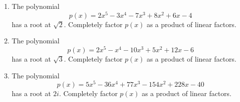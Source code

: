 \documentclass{article}
\begin{document}
\ActivityTitle[class={College Algebra}, number={5}, name={Polynomials 3}]

\begin{enumerate}
\item The polynomial \[ p(x) = 2x^5 - 3x^4 - 7x^3 + 8x^2 + 6x - 4 \] has a root at $\sqrt{2}$. Completely factor $p(x)$ as a product of linear factors. \vspace{7cm}

\newpage

\item The polynomial \[ p(x) = 2x^5 - x^4 - 10x^3 + 5x^2 + 12x - 6 \] has a root at $\sqrt{3}$. Completely factor $p(x)$ as a product of linear factors. \vspace{7cm}

\newpage

\item The polynomial \[ p(x) = 5x^5 - 36x^4 + 77x^3 - 154x^2 + 228x - 40 \] has a root at $2i$. Completely factor $p(x)$ as a product of linear factors. \vspace{7cm}

\end{enumerate}
\end{document}
